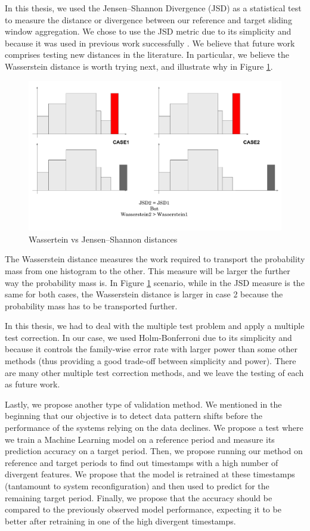 In this thesis, we used the Jensen–Shannon Divergence (JSD) as a statistical test to measure the distance or divergence between our reference and target sliding window aggregation. We chose to use the JSD metric due to its simplicity and because it was used in previous work successfully \cite{SAMM}. We believe that future work comprises testing new distances in the literature. In particular, we believe the Wasserstein distance is worth trying next, and illustrate why in Figure \ref{fig:wasserteinvsjsd}.
\begin{figure}[!htb]
    \begin{center}
      \includegraphics[scale=0.6]{figures/wasserstein-vs-jsd.pdf}
      \caption{Wassertein vs Jensen–Shannon distances}
      \label{fig:wasserteinvsjsd}
    \end{center}
\end{figure}
The Wasserstein distance measures the work required to transport the probability mass from one histogram to the other. This measure will be larger the further way the probability mass is. In Figure \ref{fig:wasserteinvsjsd} scenario, while in the JSD measure is the same for both cases, the Wasserstein distance is larger in case 2 because the probability mass has to be transported further.

In this thesis, we had to deal with the multiple test problem and apply a multiple test correction. In our case, we used Holm-Bonferroni due to its simplicity and because it controls the family-wise error rate with larger power than some other methods (thus providing a good trade-off between simplicity and power). There are many other multiple test correction methods, and we leave the testing of each as future work.

Lastly, we propose another type of validation method. We mentioned in the beginning that our objective is to detect data pattern shifts before the performance of the systems relying on the data declines. We propose a test where we train a Machine Learning model on a reference period and measure its prediction accuracy on a target period. Then, we propose running our method on reference and target periods to find out timestamps with a high number of divergent features. We propose that the model is retrained at these timestamps (tantamount to system reconfiguration) and then used to predict for the remaining target period. Finally, we propose that the accuracy should be compared to the previously observed model performance, expecting it to be better after retraining in one of the high divergent timestamps.

